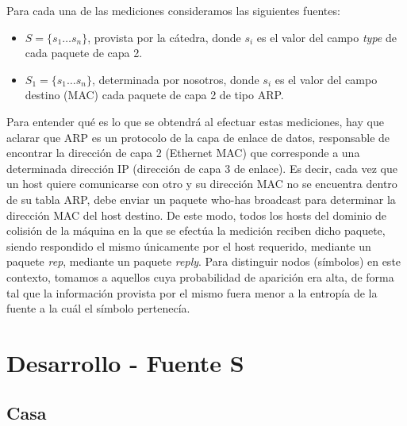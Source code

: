 \documentclass[final,narroweqnarray,inline]{ieee}
\begin{document}
Para cada una de las mediciones consideramos las siguientes fuentes: 
\begin{itemize}

  \item $S = \{s_{1} \dots s_{n}\}$, provista por la cátedra, donde
  $s_{i}$ es el valor del campo \emph{type} de cada paquete de capa
  2.

  \item $S_{1} = \{s_{1} \dots s_{n}\} $, determinada por nosotros,
  donde $s_i$ es el valor del campo destino (MAC) cada paquete de
  capa 2 de tipo ARP.

\end{itemize}

\medskip

Para entender qué es lo que se obtendrá al efectuar estas mediciones,
hay que aclarar que ARP es un protocolo de la capa de enlace de
datos, responsable de encontrar la dirección de capa 2 (Ethernet MAC)
que corresponde a una determinada dirección IP (dirección de capa 3
de enlace). Es decir, cada vez que un host quiere comunicarse con
otro y su dirección MAC no se encuentra dentro de su tabla ARP, debe
enviar un paquete who-has broadcast para determinar la dirección MAC
del host destino. De este modo, todos los hosts del dominio de
colisión de la máquina en la que se efectúa la medición reciben dicho
paquete, siendo respondido el mismo únicamente por el host requerido,
mediante un paquete \emph{rep}, mediante un paquete \emph{reply}.
Para distinguir nodos (símbolos) en este contexto, tomamos a aquellos
cuya probabilidad de aparición era alta, de forma tal que la
información provista por el mismo fuera menor a la entropía de la
fuente a la cuál el símbolo pertenecía.

\newpage
\section{Desarrollo - Fuente S}
  \subsection{Casa}

\end{document}
